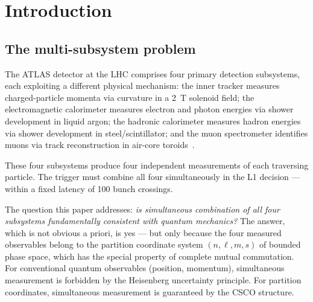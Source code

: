 \documentclass[twocolumn,10pt,a4paper]{article}
\theoremstyle{thmstyle}
\theoremstyle{definition}
\theoremstyle{remark}
\begin{document}
\begin{abstract}
We introduce the \emph{Kuramoto order parameter} for the LHC detector
$R_c = \exp(-2\pi^2 \cdot \mathrm{CV}^2)$ where $\mathrm{CV} = \mathrm{RMSSD}/\bar T_{BX}$,
and prove that the five operational detector regimes
(turbulent $R_c < 0.3$, aperture $0.3$--$0.5$, cascade $0.5$--$0.8$,
coherent $0.8$--$0.95$, phase-locked $R_c > 0.95$)
correspond to the five thermodynamic regimes of detected ions
(Theorem~\ref{thm:five_regimes}), establishing a precise mapping
from detector synchronisation quality to event classification quality.

\medskip
\noindent\textbf{Keywords:} quantum non-demolition; complete commuting
observables; single-particle thermodynamics; categorical temperature;
fundamental identity; heat-entropy decoupling; Kuramoto order parameter;
detector regimes; LHC trigger; partition coordinates
\end{abstract}

\tableofcontents

\section{Introduction}
\label{sec:intro}

\subsection{The multi-subsystem problem}

The ATLAS detector at the LHC comprises four primary detection subsystems,
each exploiting a different physical mechanism:
the inner tracker measures charged-particle momenta via curvature in
a 2~T solenoid field;
the electromagnetic calorimeter measures electron and photon energies
via shower development in liquid argon;
the hadronic calorimeter measures hadron energies via shower development
in steel/scintillator;
and the muon spectrometer identifies muons via track reconstruction in
air-core toroids~\citep{atlas2008}.

These four subsystems produce four independent measurements of each
traversing particle. The trigger must combine all four simultaneously
in the L1 decision — within a fixed latency of 100 bunch crossings.

The question this paper addresses: \emph{is simultaneous combination of
all four subsystems fundamentally consistent with quantum mechanics?}
The answer, which is not obvious a priori, is yes — but only because
the four measured observables belong to the partition coordinate system
$(n,\ell,m,s)$ of bounded phase space, which has the special property
of complete mutual commutation. For conventional quantum observables
(position, momentum), simultaneous measurement is forbidden by the
Heisenberg uncertainty principle. For partition coordinates, simultaneous
measurement is guaranteed by the CSCO structure.
\end{document}
